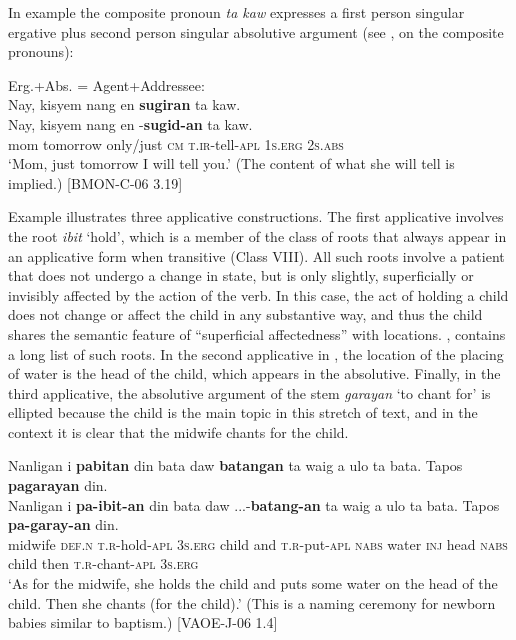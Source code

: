 In example  the composite pronoun \textit{ta kaw} expresses a first person singular ergative plus second person singular absolutive argument (see ,  on the composite pronouns):

\ea
\label{bkm:Ref118204368}
Erg.+Abs. = Agent+Addressee: \\
Nay,  kisyem   nang  en  \textbf{sugiran}  ta kaw. \\\smallskip
\gll Nay,  kisyem   nang  en  \emptyset{}-\textbf{sugid-an}  ta kaw.\footnotemark{} \\
mom  tomorrow  only/just  \textsc{cm}  \textsc{t.ir}-tell-\textsc{apl}  1\textsc{s.erg} 2\textsc{s.abs} \\
\glt ‘Mom, just tomorrow I will tell you.’ (The content of what she will tell is implied.) [BMON-C-06 3.19]
\z

Example  illustrates three applicative constructions. The first applicative involves the root \textit{ibit} ‘hold’, which is a member of the class of roots that always appear in an applicative form when transitive (Class VIII). All such roots involve a patient that does not undergo a change in state, but is only slightly, superficially or invisibly affected by the action of the verb. In this case, the act of holding a child does not change or affect the child in any substantive way, and thus the child shares the semantic feature of “superficial affectedness” with locations. ,  contains a long list of such roots. In the second applicative in , the location of the placing of water is the head of the child, which appears in the absolutive. Finally, in the third applicative, the absolutive argument of the stem \textit{garayan} ‘to chant for’ is ellipted because the child is the main topic in this stretch of text, and in the context it is clear that the midwife chants for the child.

\ea
\label{bkm:Ref118204569}
Nanligan  i  \textbf{pabitan}  din  bata  daw  \textbf{batangan} ta waig  a  ulo  ta  bata.  Tapos  \textbf{pagarayan}  din.\\\smallskip
\gll Nanligan  i  \textbf{pa-ibit-an}  din  bata  daw  ...-\textbf{batang-an} ta waig  a  ulo  ta  bata.  Tapos  \textbf{pa-garay-an}  din.\\
midwife  \textsc{def.n}  \textsc{t.r}-hold-\textsc{apl}  3\textsc{s.erg}  child  and  \textsc{t.r}-put-\textsc{apl} \textsc{nabs}  water  \textsc{inj}  head  \textsc{nabs}  child  then  \textsc{t.r}-chant-\textsc{apl}  3\textsc{s.erg} \\
\glt `As for the midwife, she holds the child and puts some water on the head of the child. Then she chants (for the child).’ (This is a naming ceremony for newborn babies similar to baptism.) [VAOE-J-06 1.4]
\z

